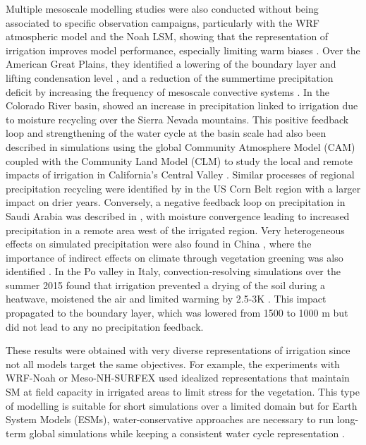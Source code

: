 Multiple mesoscale modelling studies were also conducted without being associated to specific observation campaigns, particularly with the WRF atmospheric model and the Noah LSM, showing that the representation of irrigation improves model performance, especially limiting warm biases \citep{qian_modeling_2013, yang_impact_2017,qian_neglecting_2020, liu_simulating_2021}. Over the American Great Plains, they identified a lowering of the boundary layer and lifting condensation level \citep{qian_modeling_2013}, and a reduction of the summertime precipitation deficit by increasing the frequency of mesoscale convective systems \citep{qian_neglecting_2020}. In the Colorado River basin, \citet{yang_impact_2017} showed an increase in precipitation linked to irrigation due to moisture recycling over the Sierra Nevada mountains. This positive feedback loop and strengthening of the water cycle at the basin scale had also been described in simulations using the global Community Atmosphere Model (CAM) coupled with the Community Land Model (CLM) to study the local and remote impacts of irrigation in California's Central Valley \citep{lo_irrigation_2013}. 
Similar processes of regional precipitation recycling were identified by \citet{zhang_us_2025} in the US Corn Belt region with a larger impact on drier years.
Conversely, a negative feedback loop on precipitation in Saudi Arabia was described in \citep{lo_intense_2021}, with moisture convergence leading to increased precipitation in a remote area west of the irrigated region. Very heterogeneous effects on simulated precipitation were also found in China \citep{liu_simulating_2021}, where the importance of indirect effects on climate through vegetation greening was also identified \citep{liu_irrigation-induced_2023}. In the Po valley in Italy, convection-resolving simulations over the summer 2015 found that irrigation prevented a drying of the soil during a heatwave, moistened the air and limited warming by 2.5-3K \citep{valmassoi_regional_2020}. This impact propagated to the boundary layer, which was lowered from 1500 to 1000 m but did not lead to any no precipitation feedback.

These results were obtained with very diverse representations of irrigation since not all models target the same objectives. For example, the experiments with WRF-Noah or Meso-NH-SURFEX \citep{lunel_irrigation_2024} used idealized representations that maintain SM at field capacity in irrigated areas to limit stress for the vegetation. This type of modelling is suitable for short simulations over a limited domain but for Earth System Models (ESMs), water-conservative approaches are necessary to run long-term global simulations while keeping a consistent water cycle representation \citep{valmassoi_review_2022}. 

